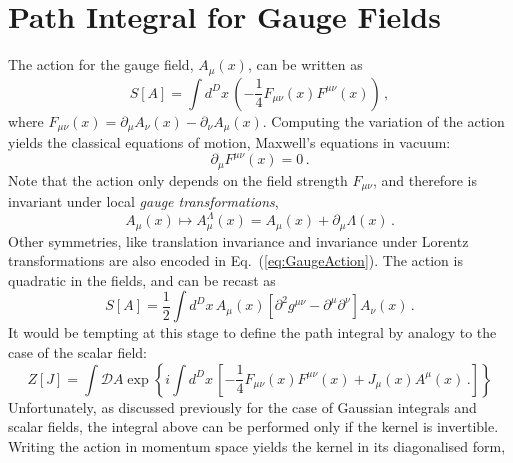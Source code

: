 \renewcommand{\tphi}{\tilde{\phi}}
\renewcommand{\tj}{\tilde{J}}
\renewcommand{\tchi}{\tilde{\chi}}
\renewcommand{\psibar}{\bar{\psi}}
\renewcommand{\etabar}{\bar{\eta}}
\renewcommand{\munu}{{\mu\nu}}

\section{Path Integral for Gauge Fields}
\label{sec:gauge-fields}

The action for the gauge field, $A_\mu(x)$, can be written as
\begin{equation}
  \label{eq:GaugeAction}
  S[A] = \int d^Dx\, \left(-\frac14 F_{\mu\nu}(x)
    F^{\mu\nu}(x)\right)\, ,
\end{equation}
where $F_{\mu\nu}(x)=\partial_\mu A_\nu(x) - \partial_\nu A_\mu(x)$. 
Computing the variation of the action yields the classical equations
of motion, \ie Maxwell's equations in vacuum: 
\begin{equation}
  \label{eq:MaxEqs}
  \partial_\mu F^{\mu\nu}(x) = 0\, .
\end{equation}
Note that the action only depends on the field strength $F_\munu$,
and therefore is invariant under local {\em gauge transformations},
\begin{equation}
  \label{eq:GaugeTransf}
  A_\mu(x) \mapsto A^\Lambda_\mu(x) = A_\mu(x) + \partial_\mu \Lambda(x)\, .
\end{equation}
Other symmetries, like translation invariance and invariance under
Lorentz transformations are also encoded in
Eq.~(\ref{eq:GaugeAction}). 
The action is quadratic in the fields, and can be recast as 
\begin{equation}
  \label{eq:GaugeActionTwo}
  S[A] = \frac12 \int d^Dx\, A_\mu(x) \left[
    \partial^2 g^{\mu\nu} - \partial^\mu \partial^\nu
    \right] A_\nu(x)\, .
\end{equation}
It would be tempting at this stage to define the path integral by
analogy to the case of the scalar field:
\begin{equation}
  \label{eq:WrongPathInt}
  Z[J] = \int \mathcal{D}A \exp\left\{
    i \int d^Dx\, \left[
      -\frac14 F_{\mu\nu}(x) F^\munu(x) + J_\mu(x) A^\mu(x)\, .
      \right]
    \right\}
\end{equation}
Unfortunately, as discussed previously for the case of Gaussian
integrals and scalar fields, the integral above can be performed only
if the kernel is invertible. Writing the action in momentum space
yields the kernel in its diagonalised form, 
